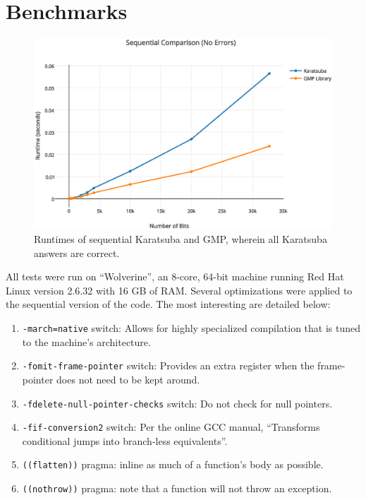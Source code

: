 \documentclass[8pt, twocolumn]{article}
\begin{document}
\section{Benchmarks}
\begin{figure}[t]
    \includegraphics[scale=0.4]{sequential-error-free}
    \caption{Runtimes of sequential Karatsuba and GMP, wherein all Karatsuba answers
    are correct.}
    \label{fig:sequential-correct}
\end{figure}
All tests were run on ``Wolverine'', an 8-core, 64-bit machine running Red Hat
Linux version 2.6.32 with 16 GB of RAM.  Several optimizations were applied to
the sequential version of the code.  The most interesting are detailed below:
\begin{enumerate}
    \item \texttt{-march=native} switch: Allows for highly specialized compilation
          that is tuned to the machine's architecture.
    \item \texttt{-fomit-frame-pointer} switch: Provides an extra register when the
           frame-pointer does not need to be kept around.
    \item \texttt{-fdelete-null-pointer-checks} switch:  Do not check for null
          pointers.
    \item \texttt{-fif-conversion2} switch: Per the online GCC manual, ``Transforms
          conditional jumps into branch-less equivalents''.
    \item \texttt{((flatten))} pragma: inline as much of a function's body as
          possible.
    \item \texttt{((nothrow))} pragma: note that a function will not throw an
          exception.
\end{enumerate}
\end{document}
